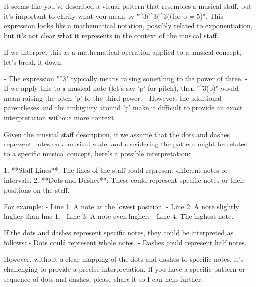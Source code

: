 It seems like you've described a visual pattern that resembles a musical staff, but it's important to clarify what you mean by "^3(^3(^3((for p = 5)". This expression looks like a mathematical notation, possibly related to exponentiation, but it's not clear what it represents in the context of the musical staff.

If we interpret this as a mathematical operation applied to a musical concept, let's break it down:

- The expression "^3" typically means raising something to the power of three.
- If we apply this to a musical note (let's say 'p' for pitch), then "^3(p)" would mean raising the pitch 'p' to the third power.
- However, the additional parentheses and the ambiguity around 'p' make it difficult to provide an exact interpretation without more context.

Given the musical staff description, if we assume that the dots and dashes represent notes on a musical scale, and considering the pattern might be related to a specific musical concept, here’s a possible interpretation:

1. **Staff Lines**: The lines of the staff could represent different notes or intervals.
2. **Dots and Dashes**: These could represent specific notes or their positions on the staff.

For example:
- Line 1: A note at the lowest position.
- Line 2: A note slightly higher than line 1.
- Line 3: A note even higher.
- Line 4: The highest note.

If the dots and dashes represent specific notes, they could be interpreted as follows:
- Dots could represent whole notes.
- Dashes could represent half notes.

However, without a clear mapping of the dots and dashes to specific notes, it's challenging to provide a precise interpretation. If you have a specific pattern or sequence of dots and dashes, please share it so I can help further.